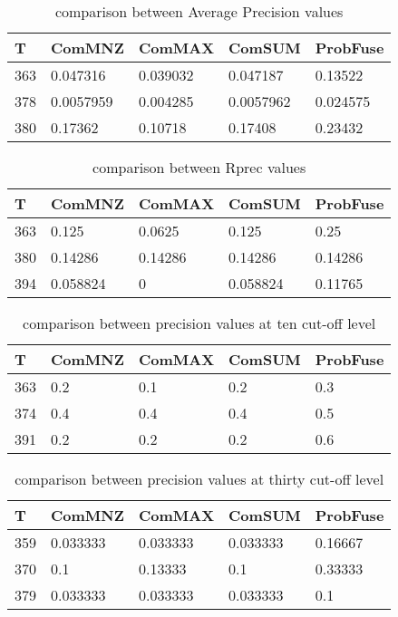 \documentclass[12pt,journal]{IEEEtran}
\begin{document}
\begin{table}[h!]
\centering
\caption{comparison between Average Precision values}
\begin{tabular}{|l|l|l|l|l|}
\hline
T   & ComMNZ    & ComMAX   & ComSUM    & ProbFuse \\ \hline
363 & 0.047316  & 0.039032 & 0.047187  & 0.13522  \\ \hline
378 & 0.0057959 & 0.004285 & 0.0057962 & 0.024575 \\ \hline
380 & 0.17362   & 0.10718  & 0.17408   & 0.23432 \\ \hline
\end{tabular}
\end{table}

\begin{table}[h!]
\centering
\caption{comparison between Rprec values}
\begin{tabular}{|l|l|l|l|l|}
\hline
T   & ComMNZ   & ComMAX  & ComSUM   & ProbFuse \\ \hline
363 & 0.125    & 0.0625  & 0.125    & 0.25     \\ \hline
380 & 0.14286  & 0.14286 & 0.14286  & 0.14286  \\ \hline
394 & 0.058824 & 0       & 0.058824 & 0.11765  \\  \hline
\end{tabular} 
\end{table}


\begin{table}[h!]
\centering
\caption{comparison between precision values at ten cut-off level}
\begin{tabular}{|l|l|l|l|l|}
\hline
T   & ComMNZ & ComMAX & ComSUM & ProbFuse \\ \hline
363 & 0.2    & 0.1    & 0.2    & 0.3     \\ \hline
374 & 0.4    & 0.4    & 0.4    & 0.5      \\ \hline
391 & 0.2    & 0.2    & 0.2    & 0.6     \\ \hline
\end{tabular}
\end{table}

\begin{table}[h!]
\centering
\caption{comparison between precision values at thirty cut-off level}
\begin{tabular}{|l|l|l|l|l|}
\hline
T   & ComMNZ   & ComMAX   & ComSUM   & ProbFuse \\ \hline
359 & 0.033333 & 0.033333 & 0.033333 & 0.16667  \\ \hline
370 & 0.1      & 0.13333  & 0.1      & 0.33333  \\ \hline
379 & 0.033333 & 0.033333 & 0.033333 & 0.1     \\ \hline
\end{tabular}
\end{table}
\end{document}
